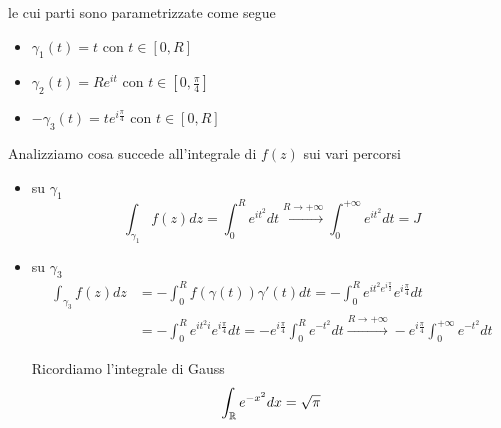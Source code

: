 le cui parti sono parametrizzate come segue
\begin{itemize}
\item $\gamma _{1}\left(t\right) = t$ con $t\in \left[ 0,R\right]$
\item $\gamma _{2}\left(t\right) = Re^{it}$ con $t\in \left[ 0,\frac{\pi }{4}\right]$
\item $ - \gamma _{3}\left(t\right) = te^{i\frac{\pi }{4}}$ con $t\in \left[ 0,R\right]$
\end{itemize}

Analizziamo cosa succede all'integrale di $f\left(z\right)$ sui vari percorsi
\begin{itemize}
\item su $\gamma _{1}$
\begin{equation*}
\int\nolimits _{\gamma _{1}} f\left(z\right) dz = \int\nolimits ^{R}_{0} e^{it^{2}} dt\xrightarrow{R\rightarrow + \infty }\int\nolimits ^{ + \infty }_{0} e^{it^{2}} dt = J
\end{equation*}
\item su $\gamma _{3}$
\begin{align*}
\int\nolimits _{\gamma _{3}} f\left(z\right) dz & = - \int\nolimits ^{R}_{0} f\left(\gamma \left(t\right)\right) \gamma '\left(t\right) dt = -\int\nolimits ^{R}_{0} e^{it^{2} e^{i\frac{\pi }{2}}} e^{i\frac{\pi }{4}} dt\\
 & = - \int\nolimits ^{R}_{0} e^{it^{2} i} e^{i\frac{\pi }{4}} dt = -e^{i\frac{\pi }{4}}\int\nolimits ^{R}_{0} e^{ - t^{2}} dt\xrightarrow{R\rightarrow + \infty } - e^{i\frac{\pi }{4}}\int\nolimits ^{ + \infty }_{0} e^{ - t^{2}} dt
\end{align*}

\begin{rem}
Ricordiamo l'integrale di Gauss
\begin{equation*}
\int\nolimits _{\mathbb{R} } e^{ - x^{2}} dx = \sqrt{\pi }
\end{equation*}
\end{rem}


\end{itemize}
